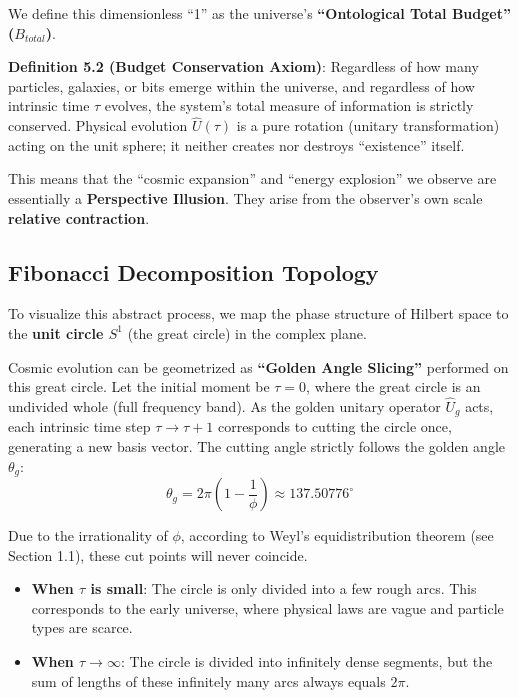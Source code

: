 We define this dimensionless ``1'' as the universe's \textbf{``Ontological Total Budget'' ($B_{total}$)}.

\textbf{Definition 5.2 (Budget Conservation Axiom)}:
Regardless of how many particles, galaxies, or bits emerge within the universe, and regardless of how intrinsic time $\tau$ evolves, the system's total measure of information is strictly conserved. Physical evolution $\hat{U}(\tau)$ is a pure rotation (unitary transformation) acting on the unit sphere; it neither creates nor destroys ``existence'' itself.

This means that the ``cosmic expansion'' and ``energy explosion'' we observe are essentially a \textbf{Perspective Illusion}. They arise from the observer's own scale \textbf{relative contraction}.

\subsection{Fibonacci Decomposition Topology}

To visualize this abstract process, we map the phase structure of Hilbert space to the \textbf{unit circle $S^1$} (the great circle) in the complex plane.

Cosmic evolution can be geometrized as \textbf{``Golden Angle Slicing''} performed on this great circle.
Let the initial moment be $\tau=0$, where the great circle is an undivided whole (full frequency band).
As the golden unitary operator $\hat{U}_g$ acts, each intrinsic time step $\tau \to \tau+1$ corresponds to cutting the circle once, generating a new basis vector. The cutting angle strictly follows the golden angle $\theta_g$:
\[\theta_g = 2\pi \left( 1 - \frac{1}{\phi} \right) \approx 137.50776^\circ\]

Due to the irrationality of $\phi$, according to Weyl's equidistribution theorem (see Section 1.1), these cut points will never coincide.

\begin{itemize}
\item \textbf{When $\tau$ is small}: The circle is only divided into a few rough arcs. This corresponds to the early universe, where physical laws are vague and particle types are scarce.
\item \textbf{When $\tau \to \infty$}: The circle is divided into infinitely dense segments, but the sum of lengths of these infinitely many arcs always equals $2\pi$.
\end{itemize}

